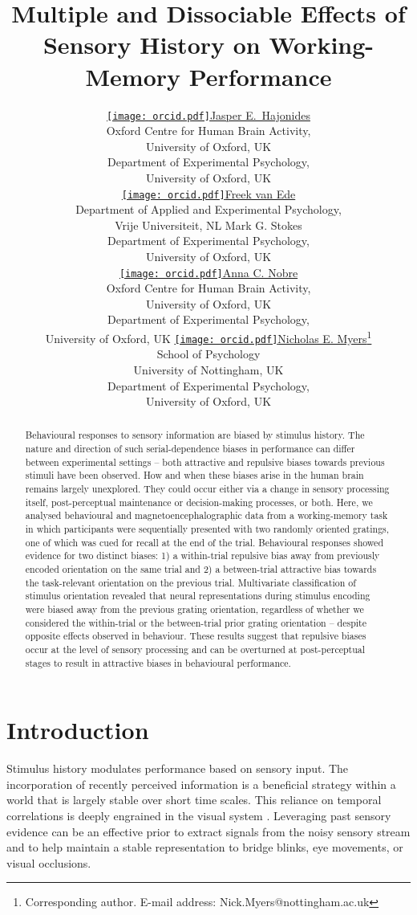 \documentclass{article}
\title{Multiple and Dissociable Effects of Sensory History on Working-Memory Performance}
\author{ \href{https://orcid.org/0000-0002-0812-6842}{\texttt{[image: orcid.pdf]}\hspace{1mm}Jasper  E.~Hajonides} \\
	Oxford Centre for Human Brain Activity, \\
	University of Oxford, UK\\
	Department of Experimental Psychology, \\
	University of Oxford, UK \\
	\And
	\href{https://orcid.org/0000-0002-7434-1751}{\texttt{[image: orcid.pdf]}\hspace{1mm}Freek van Ede} \\
	Department of Applied and Experimental Psychology,\\
	Vrije Universiteit, NL
	\AND
	Mark G. Stokes \\
	Department of Experimental Psychology, \\
	University of Oxford, UK \\
	\And
	\href{https://orcid.org/0000-0001-5762-2802}{\texttt{[image: orcid.pdf]}\hspace{1mm}Anna C. Nobre} \\
	Oxford Centre for Human Brain Activity, \\
	University of Oxford, UK\\
	Department of Experimental Psychology, \\
	University of Oxford, UK
	\And
	\href{https://orcid.org/0000-0001-5599-3044}{\texttt{[image: orcid.pdf]}\hspace{1mm}Nicholas E. Myers}\thanks{Corresponding author. E-mail address: Nick.Myers@nottingham.ac.uk} \\
	School of Psychology \\
	University of Nottingham, UK \\ 
	Department of Experimental Psychology, \\
	University of Oxford, UK
}
\begin{document}
\maketitle

\begin{abstract}
Behavioural responses to sensory information are biased by stimulus history. The nature and direction of such serial-dependence biases in performance can differ between experimental settings – both attractive and repulsive biases towards previous stimuli have been observed. How and when these biases arise in the human brain remains largely unexplored. They could occur either via a change in sensory processing itself, post-perceptual maintenance or decision-making processes, or both. Here, we analysed behavioural and magnetoencephalographic data from a working-memory task in which participants were sequentially presented with two randomly oriented gratings, one of which was cued for recall at the end of the trial. Behavioural responses showed evidence for two distinct biases: 1) a within-trial repulsive bias away from previously encoded orientation on the same trial and 2) a between-trial attractive bias towards the task-relevant orientation on the previous trial. Multivariate classification of stimulus orientation revealed that neural representations during stimulus encoding were biased away from the previous grating orientation, regardless of whether we considered the within-trial or the between-trial prior grating orientation – despite opposite effects observed in behaviour. These results suggest that repulsive biases occur at the level of sensory processing and can be overturned at post-perceptual stages to result in attractive biases in behavioural performance. 
\end{abstract}
%
%


\section{Introduction}
Stimulus history modulates performance based on sensory input. The incorporation of recently perceived information is a beneficial strategy within a world that is largely stable over short time scales. This reliance on temporal correlations is deeply engrained in the visual system \parencite{Singer1995}. Leveraging past sensory evidence can be an effective prior to extract signals from the noisy sensory stream and to help maintain a stable representation to bridge blinks, eye movements, or visual occlusions. 
\end{document}
